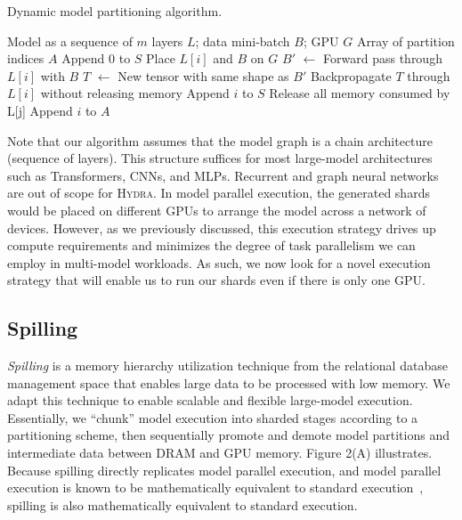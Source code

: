 \documentclass{article}
\newcommand{\system}{\textsc{Hydra}}
\begin{document}
\begin{algorithm}[tb]
 \caption{Dynamic model partitioning algorithm.}
  \label{alg:partitioning}
 \begin{algorithmic}
  Model as a sequence of $m$ layers $L$; data mini-batch $B$; GPU $G$
   Array of partition indices $A$
 \STATE Append 0 to $S$
 \STATE Place $L[i]$ and $B$ on $G$
 \STATE $B'$ $\leftarrow$ Forward pass through $L[i]$ with $B$
 \STATE$T$ $\leftarrow$ New tensor with same shape as $B'$
 \STATE  Backpropagate $T$ through $L[i]$ without releasing memory
   	\STATE Append $i$ to $S$
		\STATE Release all memory consumed by L[j]
		\STATE Append $i$ to $A$
	\ENDFOR
   \ENDIF
   \ENDFOR
  \end{algorithmic}
\end{algorithm}

Note that our algorithm assumes that the model graph is a chain architecture (sequence of layers). This structure suffices for most large-model architectures such as Transformers, CNNs, and MLPs. Recurrent and graph neural networks are out of scope for \system. In model parallel execution, the generated shards would be placed on different GPUs to arrange the model across a network of devices. However, as we previously discussed, this execution strategy drives up compute requirements and minimizes the degree of task parallelism we can employ in multi-model workloads. As such, we now look for a novel execution strategy that will enable us to run our shards even if there is only one GPU.

\subsection{Spilling}
\textit{Spilling} is a memory hierarchy utilization technique from the relational database management space that enables large data to be processed with low memory. We adapt this technique to enable scalable and flexible large-model execution. Essentially, we ``chunk'' model execution into sharded stages according to a partitioning scheme, then sequentially promote and demote model partitions and intermediate data between DRAM and GPU memory. Figure 2(A) illustrates. Because spilling directly replicates model parallel execution, and model parallel execution is known to be mathematically equivalent to standard execution~\cite{modelparallelism}, spilling is also mathematically equivalent to standard execution.
\end{document}
